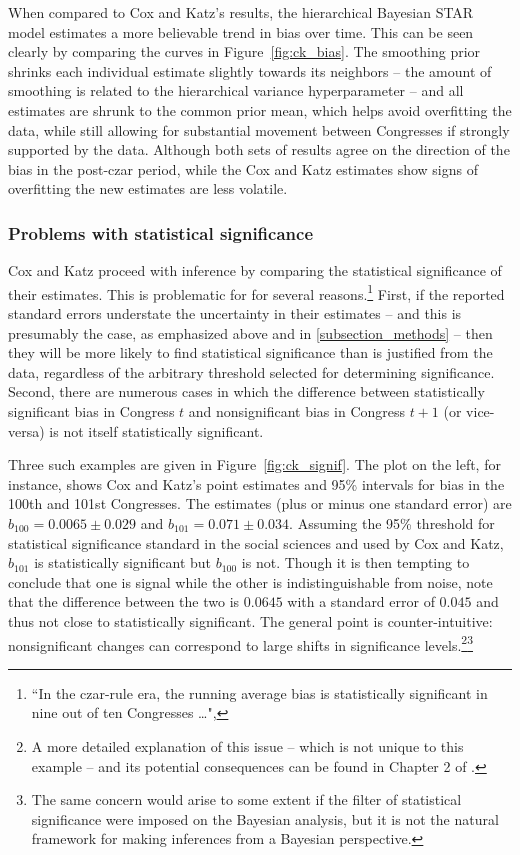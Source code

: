When compared to Cox and Katz's results, the hierarchical Bayesian STAR model estimates 
a more believable trend in bias over time. This can be seen clearly by comparing the curves 
in Figure~\ref{fig:ck_bias}. The smoothing prior shrinks each individual estimate slightly 
towards its neighbors -- the amount of smoothing is related to the hierarchical variance 
hyperparameter -- and all estimates are shrunk to the common prior mean, which helps 
avoid overfitting the data, while still allowing for substantial movement between Congresses 
if strongly supported by the data. Although both sets of results agree on the direction of the 
bias in the post-czar period, while the Cox and Katz estimates show signs of overfitting 
the new estimates are less volatile. 


\subsubsection{Problems with statistical significance}

Cox and Katz proceed with inference by comparing the statistical significance of their 
estimates. This is problematic for for several reasons.\footnote{``In the czar-rule era, 
the running average bias is statistically significant in nine out of ten Congresses \dots", } 
First, if the reported standard errors understate the uncertainty in their estimates 
-- and this is presumably the case, as emphasized above and in \ref{subsection_methods} 
-- then they will be more likely to find statistical significance than is justified from the data, 
regardless of the arbitrary threshold selected for determining significance. Second, there
are numerous cases in which the difference between statistically significant 
bias in Congress $t$ and nonsignificant bias in Congress $t + 1$ (or vice-versa) is not itself 
statistically significant. 

Three such examples are given in Figure~\ref{fig:ck_signif}. The plot on the left, for instance, 
shows Cox and Katz's point estimates and 95\% intervals for bias in the 100th and 101st 
Congresses. The estimates (plus or minus one standard error) are $b_{100} = 0.0065 \pm 0.029$ 
and $b_{101} = 0.071 \pm 0.034$. Assuming the 95\% threshold for statistical significance 
standard in the social sciences and used by Cox and Katz, $b_{101}$ is statistically significant 
but $b_{100}$ is not. Though it is then tempting to conclude that one is signal while the other 
is indistinguishable from noise, note that the difference between the two is 
$0.0645$ with a standard error of $0.045$ and thus not close to statistically significant. 
The general point is counter-intuitive: nonsignificant changes can correspond to large shifts 
in significance levels.\footnote{A more detailed explanation of this issue -- which is not unique to this 
example -- and its potential consequences can be found in Chapter 2 of 
.}\footnote{The same concern would arise to some extent if the filter 
of statistical significance were imposed on the Bayesian analysis, but it is not the natural framework 
for making inferences from a Bayesian perspective.} 

